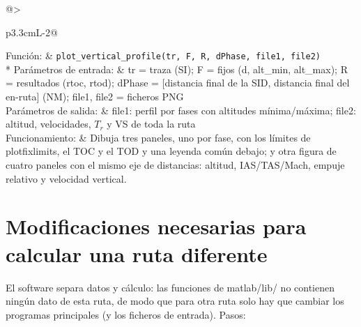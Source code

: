 \documentclass[11pt,a4paper]{article}
\makeatletter
\newcommand{\funcion}[4]{\par\Needspace{8\baselineskip}\begingroup\setlength{\LTleft}{0pt}\setlength{\LTright}{0pt}%
\setlength{\LTpre}{2mm}\setlength{\LTpost}{3mm}%
\begin{longtable}{@{}>{\bfseries\raggedright\arraybackslash}p{3.3cm}L{\dimexpr\linewidth-3.3cm-2\tabcolsep\relax}@{}}\toprule
Función: & \texttt{#1}\\* \midrule
Parámetros de entrada: & #2\\ \midrule
Parámetros de salida: & #3\\ \midrule
Funcionamiento: & #4\\ \bottomrule
\end{longtable}\addtocounter{table}{-1}\endgroup}
\DeclareRobustCommand{\m}[1]{{\ttfamily\def\_{\textunderscore\penalty100\relax}#1}}
\makeatother
\begin{document}
\funcion{plot\_vertical\_profile(tr, F, R, dPhase, file1, file2)}
{\m{tr} = traza (SI); \m{F} = fijos (d, alt\_min, alt\_max); \m{R} = resultados (\m{r\_toc}, \m{r\_tod}); \m{dPhase} = [distancia final de la SID, distancia final del en-ruta] (NM); \m{file1}, \m{file2} = ficheros PNG}
{\m{file1}: perfil por fases con altitudes mínima/máxima; \m{file2}: altitud, velocidades, $T_r$ y VS de toda la ruta}
{Dibuja tres paneles, uno por fase, con los límites de \m{plot\_fix\_limits}, el TOC y el TOD y una leyenda común debajo; y otra figura de cuatro paneles con el mismo eje de distancias: altitud, IAS/TAS/Mach, empuje relativo y velocidad vertical.}

\section{Modificaciones necesarias para calcular una ruta diferente}\label{ap:otra-ruta}

El software separa datos y cálculo: las funciones de \m{matlab/lib/} no contienen ningún dato de esta ruta, de modo que para otra ruta solo hay que cambiar los programas principales (y los ficheros de entrada). Pasos:
\end{document}
